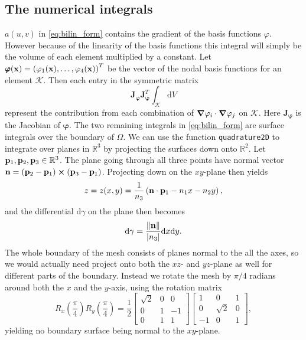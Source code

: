 \subsection{The numerical integrals}
$a(u,v)$ in \eqref{eq:bilin_form} contains the gradient of the basis functions $\varphi$. However because of the linearity of the basis functions this integral will simply be the volume of each element multiplied by a constant. Let $\pmb{\varphi}(\vb{x}) = \left(\varphi_1(\vb{x}),\dots,\varphi_4(\vb{x})\right)^T$ be the vector of the nodal basis functions for an element $\mathcal{K}$. Then each entry in the symmetric matrix
\begin{equation}
    \pmb{J}_{\pmb{\varphi}}^{\phantom{}} \pmb{J}_{\pmb{\varphi}}^T\int_\mathcal{K} \! \mathrm{d}V
\end{equation}
represent the contribution from each combination of $\grad{\varphi_i}\cdot\grad{\varphi_j}$ on $\mathcal{K}$. Here $\pmb{J}_{\pmb{\varphi}}$ is the Jacobian of $\pmb{\varphi}$. The two remaining integrals in \eqref{eq:bilin_form} are surface integrals over the boundary of $\Omega$. We can use the function \texttt{quadrature2D} to integrate over planes in $\mathbb{R}^3$ by projecting the surfaces down onto $\mathbb{R}^2$. Let $\vb{p}_1,\vb{p}_2,\vb{p}_3 \in \mathbb{R}^3$. The plane going through all three points have normal vector $\vb{n} = (\vb{p}_2-\vb{p}_1)\cross (\vb{p}_3-\vb{p}_1)$. Projecting down on the $xy$-plane then yields
\begin{equation}
    z = z(x,y)=\frac{1}{n_3}\left(\vb{n}\cdot \vb{p}_1-n_1x-n_2y\right),
\end{equation}
and the differential $\mathrm{d}\gamma$ on the plane then becomes
\begin{equation}
    \mathrm{d}\gamma = \frac{\norm{\vb{n}}}{\abs{n_3}}\mathrm{d}x\mathrm{d}y.
\end{equation}
The whole boundary of the mesh consists of planes normal to the all the axes, so we would actually need project onto both the $xz$- and $yz$-plane as well for different parts of the boundary. Instead we rotate the mesh by $\pi/4$ radians around both the $x$ and the $y$-axis, using the rotation matrix
\begin{equation}
    R_x\left(\frac{\pi}{4}\right)R_y\left(\frac{\pi}{4}\right) = \frac{1}{2}
    \begin{bmatrix}
        \sqrt{2} & 0 & 0 \\
        0 & 1 & -1 \\
        0 & 1 & 1
     \end{bmatrix}
     \begin{bmatrix}
        1 & 0 & 1 \\
        0 & \sqrt{2} & 0 \\
        -1 & 0 & 1
     \end{bmatrix},
\end{equation}
yielding no boundary surface being normal to the $xy$-plane.

